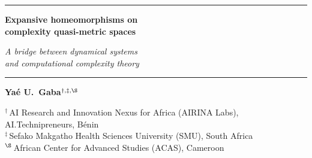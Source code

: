 \documentclass[11pt,a4paper]{article}
\theoremstyle{plain}
\theoremstyle{definition}
\begin{document}
\begin{titlepage}
\thispagestyle{titlepage}
\centering
\vspace*{0.6cm}

{\color{accent}\rule{0.4\textwidth}{0.8pt}}

\vspace{0.8cm}

{\huge\bfseries\color{accent} Expansive homeomorphisms on\\[0.5em]
 complexity quasi-metric spaces}

\vspace{0.5cm}
{\Large\itshape\color{accent!70!black} A bridge between dynamical systems\\[0.2em]
 and computational complexity theory}

\vspace{0.3cm}
{\color{accent}\rule{0.25\textwidth}{0.5pt}}

\vspace{0.8cm}

{\large
\textbf{Ya\'e U.\ Gaba}$^{\dagger,\ddagger,\S}$
}

\vspace{0.3cm}

{\normalsize\color{accent!80!black}
\href{https://orcid.org/0000-0001-8128-9704}{\aiOrcid}%
\enspace
\href{https://arxiv.org/a/gaba_y_1.html}{\aiarXiv}%
\enspace
\href{https://scholar.google.com/citations?user=UTszjV4AAAAJ&hl=en}{\aiGoogleScholar}%
}

\vspace{0.5cm}

{\small
$^{\dagger}$\,AI Research and Innovation Nexus for Africa (AIRINA Labs),
AI.Technipreneurs, B\'enin\\[0.3em]
$^{\ddagger}$\,Sefako Makgatho Health Sciences University (SMU),
South Africa\\[0.3em]
$^{\S}$\,African Center for Advanced Studies (ACAS), Cameroon
}


\end{titlepage}
\end{document}

